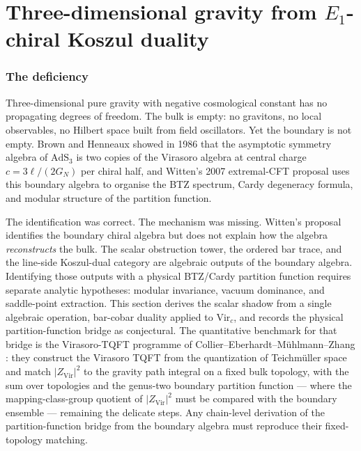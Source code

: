 \providecommand{\Abulk}{A_{\mathrm{bulk}}}
\providecommand{\Bbound}{B_{\partial}}
\providecommand{\Ethree}{\mathsf{E}_3}
\providecommand{\Zder}{\operatorname{Z}_{\mathrm{der}}}
\providecommand{\mc}{\operatorname{MC}}
\providecommand{\gSC}{\mathfrak{g}^{\mathrm{SC}}}
\providecommand{\Res}{\operatorname{Res}}
\providecommand{\HH}{\operatorname{HH}}
\providecommand{\RHom}{\operatorname{RHom}}

\section{Three-dimensional gravity from $E_1$-chiral Koszul duality}
\label{sec:3d-gravity}

\subsubsection*{The deficiency}
\label{subsec:gravity-thesis-opening}

Three-dimensional pure gravity with negative cosmological constant
has no propagating degrees of freedom. The bulk is empty:
no gravitons, no local observables, no Hilbert space built from
field oscillators. Yet the boundary is not empty. Brown and
Henneaux showed in 1986 that the asymptotic symmetry algebra of
$\mathrm{AdS}_3$ is two copies of the Virasoro algebra at central
charge $c = 3\ell/(2G_N)$ per chiral half, and Witten's 2007
extremal-CFT proposal uses this boundary algebra to organise the
BTZ spectrum, Cardy degeneracy formula, and modular structure of
the partition function.

The identification was correct. The mechanism was missing.
Witten's proposal identifies the boundary chiral algebra but does not
explain how the algebra \emph{reconstructs} the bulk. The scalar
obstruction tower, the ordered bar trace, and the line-side
Koszul-dual category are algebraic outputs of the boundary algebra.
Identifying those outputs with a physical BTZ/Cardy partition
function requires separate analytic hypotheses: modular invariance,
vacuum dominance, and saddle-point extraction. This section derives
the scalar shadow from a single algebraic operation, bar-cobar
duality applied to $\mathrm{Vir}_c$, and records the physical
partition-function bridge as conjectural. The quantitative benchmark
for that bridge is the Virasoro-TQFT programme of
Collier--Eberhardt--M\"uhlmann--Zhang \cite{CEZ23,CEZ24}: they
construct the Virasoro TQFT from the quantization of
Teichm\"uller space and match $|Z_{\mathrm{Vir}}|^{2}$ to the
gravity path integral on a fixed bulk topology, with the sum over
topologies and the genus-two boundary partition function --- where
the mapping-class-group quotient of $|Z_{\mathrm{Vir}}|^{2}$ must be
compared with the boundary ensemble --- remaining the delicate
steps. Any chain-level derivation of the partition-function bridge
from the boundary algebra must reproduce their fixed-topology
matching.

